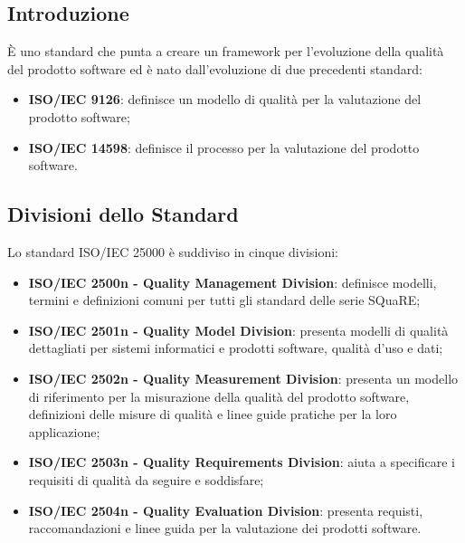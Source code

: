 \subsection{Introduzione}
È uno standard che punta a creare un framework per l'evoluzione della qualità del prodotto software ed è nato dall'evoluzione di due precedenti standard:
\begin{itemize}
	\item \textbf{ISO/IEC 9126}: definisce un modello di qualità per la valutazione del prodotto software;
	\item \textbf{ISO/IEC 14598}: definisce il processo per la valutazione del prodotto software.
\end{itemize}

\subsection{Divisioni dello Standard}
Lo standard ISO/IEC 25000 è suddiviso in cinque divisioni:
\begin{itemize}
	\item \textbf{ISO/IEC 2500n - Quality Management Division}: definisce modelli, termini e definizioni comuni per tutti gli standard delle serie SQuaRE;
	\item \textbf{ISO/IEC 2501n - Quality Model Division}: presenta modelli di qualità dettagliati per sistemi informatici e prodotti software, qualità d'uso e dati;
	\item \textbf{ISO/IEC 2502n - Quality Measurement Division}: presenta un modello di riferimento per la misurazione della qualità del prodotto software, definizioni delle misure di qualità e linee guide pratiche per la loro applicazione;
	\item \textbf{ISO/IEC 2503n - Quality Requirements Division}: aiuta a specificare i requisiti di qualità da seguire e soddisfare;
	\item \textbf{ISO/IEC 2504n - Quality Evaluation Division}: presenta requisti, raccomandazioni e linee guida per la valutazione dei prodotti software.
\end{itemize}

